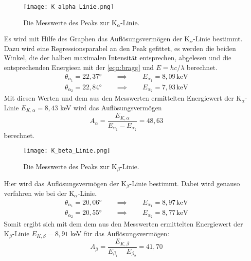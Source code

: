 \documentclass[titlepage = firstcover]{scrartcl}
\begin{document}
        \begin{figure}
          \centering
          \texttt{[image: K\_alpha\_Linie.png]}
          \caption{Die Messwerte des Peaks zur $\text{K}_{\alpha}$-Linie.}
          \label{fig:K_alpha_Linie}
        \end{figure}
        \FloatBarrier

        Es wird mit Hilfe des Graphen das Auflösungsvermögen der $\text{K}_{\alpha}$-Linie bestimmt. Dazu wird eine Regressionsparabel an den Peak gefittet, es werden die beiden Winkel, die der halben maximalen Intensität entsprechen, abgelesen und die entsprechenden Energieen mit der \autoref{eqn:bragg} und $E = hc/\lambda$ berechnet.
        \begin{align*}
          \theta_{\alpha_1} = 22,37° \quad\quad \implies \quad\quad E_{\alpha_1} = 8,09 \, \text{keV} \\
          \theta_{\alpha_2} = 22,84° \quad\quad \implies \quad\quad E_{\alpha_2} = 7,93 \, \text{keV}
        \end{align*}
        Mit diesen Werten und dem aus den Messwerten ermittelten Energiewert der $\text{K}_{\alpha}$-Linie $E_{K,\alpha} = 8,43$ keV wird das Auflösungsvermögen
        \begin{equation*}
          A_{\alpha} = \frac{E_{K,\alpha}}{E_{\alpha_1} - E_{\alpha_2}} = 48,63
        \end{equation*}
        berechnet.

        \begin{figure}
          \centering
          \texttt{[image: K\_beta\_Linie.png]}
          \caption{Die Messwerte des Peaks zur $\text{K}_{\beta}$-Linie.}
          \label{fig:K_alpha_Linie}
        \end{figure}
        \FloatBarrier

        Hier wird das Auflösungsvermögen der $\text{K}_{\beta}$-Linie bestimmt. Dabei wird genauso verfahren wie bei der $\text{K}_{\alpha}$-Linie.
        \begin{align*}
          \theta_{\alpha_1} = 20,06° \quad\quad \implies \quad\quad E_{\alpha_1} = 8,97 \, \text{keV} \\
          \theta_{\alpha_2} = 20,55° \quad\quad \implies \quad\quad E_{\alpha_2} = 8,77 \, \text{keV}
        \end{align*}
        Somit ergibt sich mit dem dem aus den Messwerten ermittelten Energiewert der $\text{K}_{\beta}$-Linie $E_{K,\beta} = 8,91$ keV für das Auflösungsvermögen:
        \begin{equation*}
          A_{\beta} = \frac{E_{K,\beta}}{E_{\beta_1} - E_{\beta_2}} = 41,70
        \end{equation*}
      
\end{document}
